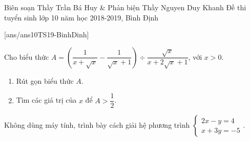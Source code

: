 \begin{name}
{Biên soạn Thầy Trần Bá Huy \& Phản biện Thầy Nguyen Duy Khanh}
{Đề thi tuyển sinh lớp 10 năm học 2018-2019, Bình Định}
\end{name}
\setcounter{ex}{0}
[ans/ans10TS19-BinhDinh]


\begin{ex}%
Cho biểu thức $A=\left(\dfrac{1}{x+\sqrt{x}}-\dfrac{1}{\sqrt{x}+1}\right)\div \dfrac{\sqrt{x}}{x+2\sqrt{x}+1}$, với $x>0$.
\begin{enumerate}
\item Rút gọn biểu thức $A$.
\item Tìm các giá trị của $x$ để $A>\dfrac{1}{2}$.
\end{enumerate}
\end{ex}



\begin{ex}%
Không dùng máy tính, trình bày cách giải hệ phương trình $\begin{cases}2x-y=4\\ x+3y=-5\end{cases}$.
\end{ex}



